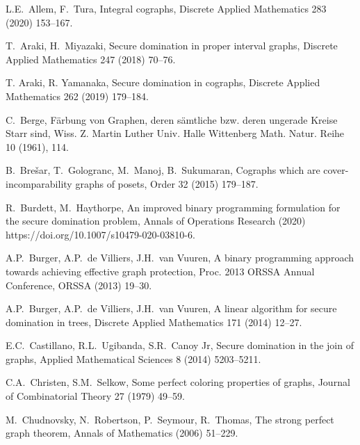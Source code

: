 \documentclass[12pt,a4paper,twoside]{article}
\theoremstyle{definition} %
\theoremstyle{plain} %
\numberwithin{equation}{section}  %
\begin{document}
\begin{thebibliography}{99}

    L.E.~Allem, F.~Tura,
    Integral cographs,
    Discrete Applied Mathematics 283 (2020) 153--167. 
    
    T.~Araki, H.~Miyazaki,
    Secure domination in proper interval graphs,
    Discrete Applied Mathematics 247 (2018) 70--76.
    
    T. Araki, R. Yamanaka,
    Secure domination in cographs,
    Discrete Applied Mathematics 262 (2019) 179--184.
    
    C.~Berge,
    F\"{a}rbung von Graphen, deren s\"{a}mtliche bzw. deren ungerade Kreise Starr sind,
    Wiss. Z. Martin Luther Univ. Halle Wittenberg Math. Natur. Reihe 10 (1961), 114.
    
    B.~Brešar, T.~Gologranc, M.~Manoj, B.~Sukumaran,
    Cographs which are cover-incomparability graphs of posets,
    Order 32 (2015) 179--187.

    R.~Burdett, M.~Haythorpe,
    An improved binary programming formulation for the secure domination problem,
    Annals of Operations Research (2020) https://doi.org/10.1007/s10479-020-03810-6.

    A.P.~Burger, A.P.~de Villiers, J.H.~van Vuuren,
    A binary programming approach towards achieving effective graph protection,
    Proc. 2013 ORSSA Annual Conference, ORSSA (2013) 19--30.

    A.P.~Burger, A.P.~de Villiers, J.H.~van Vuuren,
    A linear algorithm for secure domination in trees,
    Discrete Applied Mathematics 171 (2014) 12--27.

    E.C.~Castillano, R.L.~Ugibanda, S.R.~Canoy Jr,
    Secure domination in the join of graphs,
    Applied Mathematical Sciences 8 (2014) 5203--5211.
   
    C.A.~Christen, S.M.~Selkow,
    Some perfect coloring properties of graphs,
    Journal of Combinatorial Theory 27 (1979) 49--59.
    
    M.~Chudnovsky, N.~Robertson, P.~Seymour, R.~Thomas,
    The strong perfect graph theorem,
    Annals of Mathematics (2006) 51--229.
    

\end{thebibliography}
\end{document}
